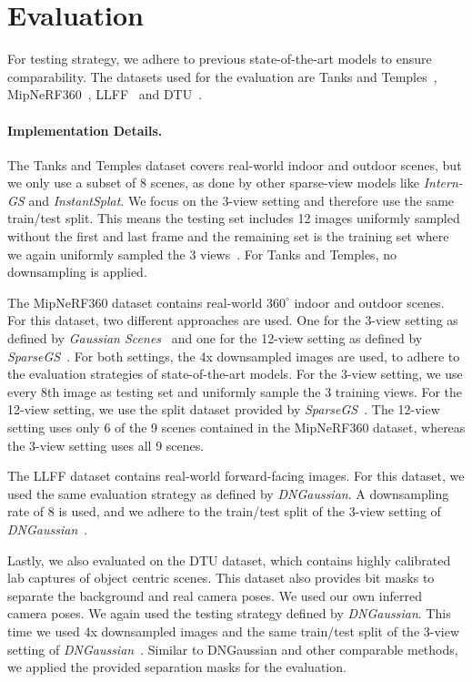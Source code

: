 \section{Evaluation}

For testing strategy, we adhere to previous state-of-the-art models to ensure comparability.
The datasets used for the evaluation are Tanks and Temples~\cite{tankstemples}, MipNeRF360~\cite{mipnerf360}, LLFF~\cite{mildenhall2019llff} and DTU~\cite{dtu}.

\paragraph{Implementation Details.}
The Tanks and Temples dataset covers real-world indoor and outdoor scenes, but we only use a subset of 8 scenes, as done by other sparse-view models like \textit{Intern-GS} and \textit{InstantSplat}. We focus on the 3-view setting and therefore use the same train/test split. This means the testing set includes 12 images uniformly sampled without the first and last frame and the remaining set is the training set where we again uniformly sampled the 3 views~\cite{InstantSplat}. For Tanks and Temples, no downsampling is applied.

The MipNeRF360 dataset contains real-world $360^\circ$ indoor and outdoor scenes. For this dataset, two different approaches are used. One for the 3-view setting as defined by \textit{Gaussian Scenes}~\cite{GaussianScenes} and one for the 12-view setting as defined by \textit{SparseGS}~\cite{SparseGS}. For both settings, the 4x downsampled images are used, to adhere to the evaluation strategies of state-of-the-art models.  For the 3-view setting, we use every 8th image as testing set and uniformly sample the 3 training views. For the 12-view setting, we use the split dataset provided by \textit{SparseGS}~\cite{SparseGS}. The 12-view setting uses only 6 of the 9 scenes contained in the MipNeRF360 dataset, whereas the 3-view setting uses all 9 scenes.

The LLFF dataset contains real-world forward-facing images. For this dataset, we used the same evaluation strategy as defined by \textit{DNGaussian}. A downsampling rate of 8 is used, and we adhere to the train/test split of the 3-view setting of \textit{DNGaussian}~\cite{DNGaussian}.

Lastly, we also evaluated on the DTU dataset, which contains highly calibrated lab captures of object centric scenes. This dataset also provides bit masks to separate the background and real camera poses. We used our own inferred camera poses. We again used the testing strategy defined by \textit{DNGaussian}. This time we used 4x downsampled images and the same train/test split of the 3-view setting of \textit{DNGaussian}~\cite{DNGaussian}. Similar to DNGaussian and other comparable methods, we applied the provided separation masks for the evaluation.

